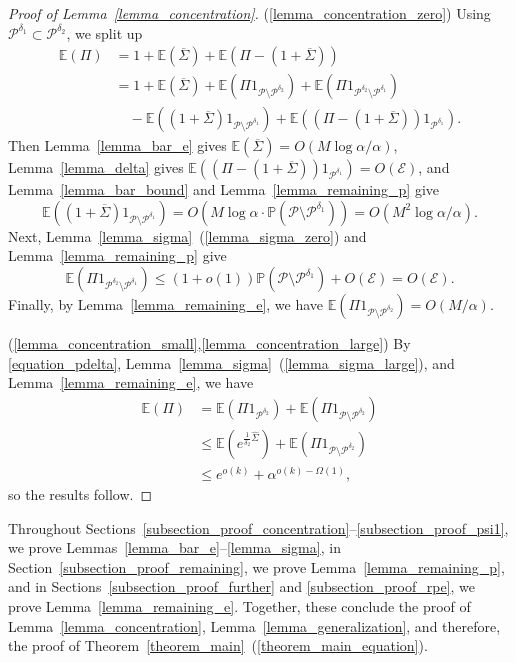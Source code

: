\documentclass{article}
\theoremstyle{plain}
\theoremstyle{remark}
\theoremstyle{plain}
\numberwithin{equation}{section}
\begin{document}
\begin{proof}[Proof of Lemma~\ref{lemma_concentration}]
		(\ref{lemma_concentration_zero}) Using $\mathcal{P}^{\delta_1}\subset\mathcal{P}^{\delta_2}$, we split up
		\begin{align}
			\mathbb{E}(\Pi)
			&=1+\mathbb{E}(\overline{\Sigma})+\mathbb{E}(\Pi-(1+\overline{\Sigma}))
			\\&=1+\mathbb{E}(\overline{\Sigma})+\mathbb{E}(\Pi1_{\mathcal{P}\setminus\mathcal{P}^{\delta_2}})+\mathbb{E}(\Pi1_{\mathcal{P}^{\delta_2}\setminus\mathcal{P}^{\delta_1}})
			\\&\quad-\mathbb{E}((1+\overline{\Sigma})1_{\mathcal{P}\setminus\mathcal{P}^{\delta_1}})+\mathbb{E}((\Pi-(1+\overline{\Sigma}))1_{\mathcal{P}^{\delta_1}}).
		\end{align}
		Then Lemma~\ref{lemma_bar_e} gives $\mathbb{E}(\overline{\Sigma})=O(M\log\alpha/\alpha)$, Lemma~\ref{lemma_delta} gives $\mathbb{E}((\Pi-(1+\overline{\Sigma}))1_{\mathcal{P}^{\delta_1}})=O(\mathscr{E})$, and Lemma~\ref{lemma_bar_bound} and Lemma~\ref{lemma_remaining_p} give  $$\mathbb{E}((1+\overline{\Sigma})1_{\mathcal{P}\setminus\mathcal{P}^{\delta_1}})=O(M\log\alpha\cdot\mathbb{P}(\mathcal{P}\setminus\mathcal{P}^{\delta_1}))=O(M^2\log\alpha/\alpha).$$ Next, Lemma~\ref{lemma_sigma}~(\ref{lemma_sigma_zero}) and Lemma~\ref{lemma_remaining_p} give $$\mathbb{E}(\Pi1_{\mathcal{P}^{\delta_2}\setminus\mathcal{P}^{\delta_1}})\leq(1+o(1))\mathbb{P}(\mathcal{P}\setminus\mathcal{P}^{\delta_1})+O(\mathscr{E})=O(\mathscr{E}).$$
		Finally, by Lemma~\ref{lemma_remaining_e}, we have $\mathbb{E}(\Pi1_{\mathcal{P}\setminus\mathcal{P}^{\delta_2}})=O(M/\alpha)$.
		
		(\ref{lemma_concentration_small},\ref{lemma_concentration_large}) By \eqref{equation_pdelta}, Lemma~\ref{lemma_sigma}~(\ref{lemma_sigma_large}), and Lemma~\ref{lemma_remaining_e}, we have
		\begin{align}
			\mathbb{E}(\Pi)&=\mathbb{E}(\Pi1_{\mathcal{P}^{\delta_2}})+\mathbb{E}(\Pi1_{\mathcal{P}\setminus\mathcal{P}^{\delta_2}})
			\\&\leq\mathbb{E}(e^{\frac1{\delta_2}\hat{\Sigma}})+\mathbb{E}(\Pi1_{\mathcal{P}\setminus\mathcal{P}^{\delta_2}})
			\\&\leq e^{o(k)}+\alpha^{o(k)-\Omega(1)},
		\end{align}
		so the results follow.
	\end{proof}
	
	Throughout Sections~\ref{subsection_proof_concentration}--\ref{subsection_proof_psi1}, we prove Lemmas~\ref{lemma_bar_e}--\ref{lemma_sigma}, in Section~\ref{subsection_proof_remaining}, we prove Lemma~\ref{lemma_remaining_p}, and in Sections~\ref{subsection_proof_further} and \ref{subsection_proof_rpe}, we prove Lemma~\ref{lemma_remaining_e}. Together, these conclude the proof of Lemma~\ref{lemma_concentration}, Lemma~\ref{lemma_generalization}, and therefore, the proof of Theorem~\ref{theorem_main}~(\ref{theorem_main_equation}).
	
\end{document}
